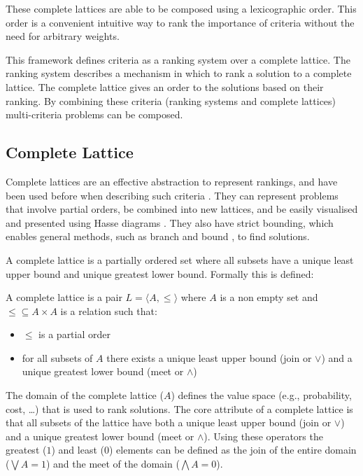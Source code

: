 These complete lattices are able to be composed using a lexicographic order.
This order is a convenient intuitive way to rank the importance of criteria without the need for arbitrary weights.

This framework defines criteria as a ranking system over a complete lattice.
The ranking system describes a mechanism in which to rank a solution to a complete lattice. 
The complete lattice gives an order to the solutions based on their ranking.
By combining these criteria (ranking systems and complete lattices) multi-criteria problems can be composed.

\subsection{Complete Lattice}
Complete lattices are an effective abstraction to represent rankings,
and have been used before when describing such criteria \cite{Bistarelli1997,Fernandez}.
They can represent problems that involve partial orders,
be combined into new lattices,
and be easily visualised and presented using Hasse diagrams \cite{davey1990introduction}.
They also have strict bounding, which enables general methods, such as branch and bound \cite{Land1960}, to find solutions.

A complete lattice is a partially ordered set where all subsets have a unique least upper bound and unique greatest lower bound.
Formally this is defined:
\begin{defs}
A complete lattice is a pair $L = \langle A, \leq \rangle$ where $A$ is a non empty set 
and $\leq \subseteq A \times A$ is a relation such that:
\begin{itemize}
  \item $\leq$ is a partial order
  \item for all subsets of $A$ there exists a unique least upper bound (join or $\vee$) and a unique greatest lower bound (meet or $\wedge$)
\end{itemize}
\end{defs}

The domain of the complete lattice ($A$) defines the value space (e.g., probability, cost, \ldots) 
that is used to rank solutions. 
The core attribute of a complete lattice is that all subsets of the lattice have both a unique least upper bound (join or $\vee$) 
and a unique greatest lower bound (meet or $\wedge$).
Using these operators the greatest ($1$) and least ($0$) elements can be defined as
the join of the entire domain ($\bigvee A = 1$) and the meet of the domain ($\bigwedge A = 0$).

